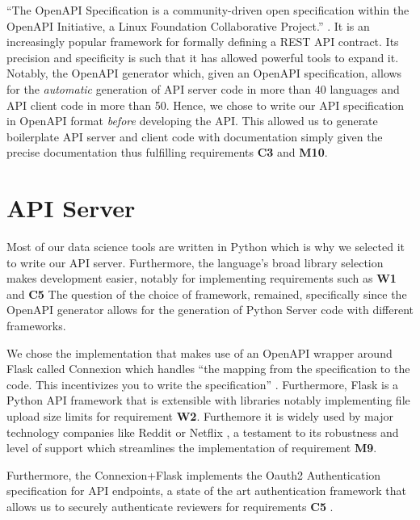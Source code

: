 \documentclass{l4proj}
\begin{document}
``The OpenAPI Specification is a community-driven open specification within the OpenAPI Initiative, a Linux Foundation Collaborative Project.'' \autocite{OAIOpenAPISpecification2020}.
It is an increasingly popular framework for formally defining a REST API contract.
Its precision and specificity is such that it has allowed powerful tools to expand it.
Notably, the OpenAPI generator \autocite{OpenAPIToolsOpenapigenerator2020} which, given an OpenAPI specification, allows for the \textit{automatic} generation of API server code in more than 40 languages and API client code in more than 50.
Hence, we chose to write our API specification in OpenAPI format \textit{before} developing the API.
This allowed us to generate boilerplate API server and client code with documentation simply given the precise documentation thus fulfilling requirements \textbf{C3} and \textbf{M10}.

\section{API Server}

Most of our data science tools are written in Python which is why we selected it to write our API server.
Furthermore, the language's broad library selection makes development easier, notably for implementing requirements such as \textbf{W1} and \textbf{C5}
The question of the choice of framework, remained, specifically since the OpenAPI generator allows for the generation of Python Server code with different frameworks.

We chose the implementation that makes use of an OpenAPI wrapper around Flask called Connexion which handles ``the mapping from the specification to the code.
This incentivizes you to write the specification'' \autocite{ZalandoConnexion2020}.
Furthermore, Flask is a Python API framework that is extensible with libraries notably implementing file upload size limits for requirement \textbf{W2}. Furthemore it is widely used by major technology companies like Reddit or Netflix \autocite{WhyDevelopersFlask}, a testament to its robustness and level of support which streamlines the implementation of requirement \textbf{M9}.

Furthermore, the Connexion+Flask implements the Oauth2 Authentication specification for API endpoints, a state of the art authentication framework that allows us to securely authenticate reviewers for requirements \textbf{C5} \autocite{jonesOAuthAuthorizationFramework2012}.
\end{document}
